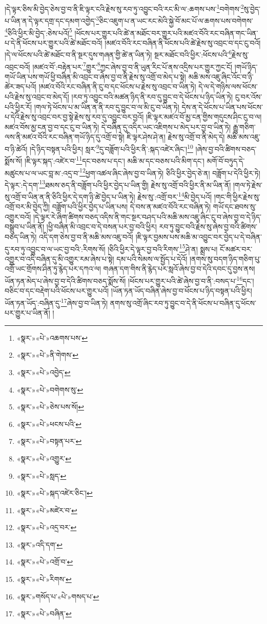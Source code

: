 །དེ་ལྟར་ཅིས་མི་བྱེད་ཅེས་བྱ་བ་ནི་ཇི་ལྟར་ངའི་རྗེས་སུ་རབ་ཏུ་འབྱུང་བའི་རང་མི་ལ་:ཆགས་པས་\footnote{«སྣར་»«པེ་»འཆགས་པས་}བགེགས་\footnote{«སྣར་»«པེ་»ནི་གེགས་}སུ་བྱེད་པ་ཡིན་ན་དེ་ལྟར་དགྲ་དང་དམག་འགྱེད་\footnote{«སྣར་»«པེ་»འབྱེད་}ཅིང་འཇུག་པ་ན་ཡང་རང་མེའི་སྐྱེ་བོ་མང་པོ་ལ་ཆགས་པས་བགེགས་\footnote{«སྣར་»«པེ་»བགེགས་སུ་}ཅིའི་ཕྱིར་མི་བྱེད་:ཅེས་པའོ།\footnote{«སྣར་»«པེ་»ཅེས་པས་སོ།} །ཕོངས་པར་གྱུར་པའི་ཚེ་ན་མཐོང་བར་གྱུར་པའི་མཛའ་བོའི་རང་བཞིན་གང་ཡིན་པ་དེ་ནི་ཕོངས་པར་གྱུར་པའི་ཚེ་མཐོང་བའོ། །མཛའ་བོའི་རང་བཞིན་ནི་ཕོངས་པའི་ཚེ་རྗེས་སུ་འབྲང་བ་དང་ངུ་བའོ། །དེ་ལ་ཕོངས་པའི་ཚེ་མཐོང་བ་ནི་སྔར་དུས་གཞན་གྱི་ཚེ་ན་ཡིན་ཏེ། སྔར་མཐོང་བའི་ཕྱིར་:ཕོངས་པའི་\footnote{«སྣར་»«པེ་»ཕངས་པའི་}རྗེས་སུ་འབྲང་བའོ། །མཛའ་བོ་:བརྟེན་པར་\footnote{«སྣར་»«པེ་»བསྟན་པར་}གྱུར་\footnote{«སྣར་»«པེ་»འགྱུར་}ཀྱང་ཞེས་བྱ་བ་ནི་ཡུན་རིང་པོ་ནས་འདྲིས་པར་གྱུར་ཀྱང་ངོ། །གཡོ་ཉིད་གཡོ་ཡིན་པས་གཡོ་ཕྱི་བཞིན་མི་འབྲང་བ་ཞེས་བྱ་བ་ནི་རྗེས་སུ་འགྲོ་བ་མེད་པ་སྟེ། མཆི་མས་འཇུ་ཞིང་འོང་བ་ཉི་ཚེར་ཟད་པའོ། །མཛའ་བོའི་རང་བཞིན་ནི་ངུ་བ་དང་ཕོངས་པ་རྗེས་སུ་འབྲང་བ་ཡིན་ཏེ། དེ་ལ་དེ་གཉིས་ལས་ཕོངས་པའི་རྗེས་སུ་འབྲང་བ་མེད་དོ། །རབ་ཏུ་འབྱུང་བའི་མཚན་ཉིད་ནི་རབ་དུ་བྱུང་བ་དེ་ཕོངས་པ་ཉིད་ཡིན་ཏེ། ངུ་བར་འོས་པའི་ཕྱིར་རོ། །གལ་ཏེ་ཕོངས་པ་མ་ཡིན་ན་ནི་རབ་དུ་བྱུང་བ་ལ་མི་ངུ་བ་ཡིན་ཏེ། དེས་ན་དེ་ཕོངས་པ་ཡིན་པས་ཕོངས་པ་དེའི་རྗེས་སུ་འབྲང་བར་བྱ་སྟེ་རྗེས་སུ་རབ་དུ་འབྱུང་བར་བྱའོ། །ཇི་ལྟར་མཛའ་བོ་མྱ་ངན་གྱིས་གདུངས་ཤིང་ངུ་བ་ལ། མཛའ་བོས་མྱ་ངན་བྱ་བ་དང་ངུ་བ་ཡིན་ཏེ། དེ་བཞིན་དུ་འདིར་ཡང་འཇིགས་པ་མེད་པར་བྱ་བ་ཡིན་ཏེ། རྒྱུ་གཅིག་ལས་ནི་མཛའ་བོའི་རང་བཞིན་གཡོ་ཉིད་དུ་འགྲོ་བ་སྟེ། ཇི་ལྟར་ཤེས་ཤེ་ན། རྗེས་སུ་འགྲོ་བ་ནི་མེད་དེ། མཆི་མས་འཇུ་བ་ཉི་ཚེའོ། །དེ་ཉིད་བསྟན་པའི་ཕྱིར། སླར་\footnote{«སྣར་»«པེ་»སླད་}དུ་བཟློག་པའི་ཕྱིར་ནི་:སྐད་འཛེར་ཞིང་།\footnote{«སྣར་»«པེ་»སྐད་འཛེར་ཅིང་།} །ཞེས་བྱ་བའི་ཚིགས་བཅད་སྨོས་སོ། །ཇི་ལྟར་སྐད་:འཛེར་བ་\footnote{«སྣར་»«པེ་»མཛེར་བ་}དང་བཅས་པ་དང་། མཆི་མ་དང་བཅས་པའི་མིག་དང་། མགོ་བོ་བཏུད་དེ་མཚུངས་པ་ལ་ཡང་བླ་མ་:འདྲ་བ་\footnote{«སྣར་»«པེ་»འདྲ་བར་}ཕྱག་འཚལ་ཞིང་ཞེས་བྱ་བ་ཡིན་ཏེ། ཅིའི་ཕྱིར་བྱེད་ཅེ་ན། བཟློག་པ་དེའི་ཕྱིར་ཏེ། དེ་ལྟར་:དེ་དག་\footnote{«སྣར་»འདི་དག་}ཐམས་ཅད་ནི་བཟློག་པའི་ཕྱིར་བྱེད་པ་ཡིན་གྱི། རྗེས་སུ་འགྲོ་བའི་ཕྱིར་ནི་མ་ཡིན་ནོ། །གལ་ཏེ་རྗེས་སུ་འགྲོ་བ་ཡིན་ན་ནི་ཅིའི་ཕྱིར་དེ་དག་ཉི་ཚེ་བྱེད་པ་ཡིན་ཏེ། རྗེས་སུ་:འགྲོ་བར་\footnote{«སྣར་»«པེ་»འགྲོ་བ་}མི་བྱེད་པའོ། །གང་གི་ཕྱིར་རྗེས་སུ་འགྲོ་བར་མི་བྱེད་ཀྱི། བཟློག་པའི་ཕྱིར་བྱེད་པ་ཡིན་པས། དེ་བས་ན་མཛའ་བོའི་རང་བཞིན་ཏེ། གཡོ་དང་ཐབས་སུ་འགྱུར་བའོ། །དེ་ལྟར་རེ་ཞིག་ཚིགས་བཅད་འདིས་ནི་གང་སྔར་བཤད་པའི་མཆི་མས་འཇུ་ཞིང་ངུ་བ་ཞེས་བྱ་བ་དེ་ཉིད་བསྒྲུབ་པ་ཡིན་ནོ། །ཕྱི་བཞིན་མི་འབྲང་བ་དེ་བསན་པར་བྱ་བའི་ཕྱིར། རབ་ཏུ་བྱུང་བའི་རྗེས་སུ་ཞེས་བྱ་བའི་ཚིགས་བཅད་ཡིན་ཏེ། འདི་དག་ཅེས་བྱ་བ་ནི་མཆི་མས་འཇུ་བའོ། །ཇི་ལྟར་བྱམས་པས་མཆི་མ་འབྱུང་བར་བྱེད་པ་དེ་བཞིན་དུ་རབ་ཏུ་འབྱུང་བ་ལ་ཡང་བྱ་བའི་:རིགས་སོ། །ཅིའི་ཕྱིར་དེ་ལྟར་བྱ་བའི་རིགས་\footnote{«སྣར་»«པེ་»རིགས་}ཤེ་ན། སྨྲས་པ། ངོ་མཚར་བར་འགྱུར་བ་འདི་བཞིན་དུ་མི་འགྱུར་རམ་ཞེས་པ་སྟེ། དམ་པའི་སེམས་ལ་སྤྱོད་པ་དེའོ། །ནགས་སུ་བདག་ཉིད་གཅིག་པུ་འགྲོ་ཡང་གྲོགས་ཤིན་ཏུ་རྙེད་པར་དཀའ་ལ། གཞན་དག་གིས་ནི་རྙེད་པར་སླའོ་ཞེས་བྱ་བ་དེའི་དབང་དུ་བྱས་ནས། ཡོན་ཏན་མེད་པ་ཞེས་བྱ་བ་དེའི་ཚིགས་བཅད་སྨོས་སོ། །ཕོངས་པར་གྱུར་པའི་ཚེ་ཞེས་བྱ་བ་ནི་:བསད་པ་\footnote{«སྣར་»གསོད་པ་«པེ་»གསད་པ་}དང་། བཅིང་བ་དང་བརྡེག་པའི་ཕོངས་པར་གྱུར་པའོ། །ཡོན་ཏན་ཡོད་བཞིན་ཞེས་བྱ་བ་ཕོངས་པ་ཉིད་བསྟན་པའི་ཕྱིར། ཡོན་ཏན་ཡོད་:བཞིན་དུ་\footnote{«སྣར་»«པེ་»བཞིན་}ཞེས་བྱ་བ་ཡིན་ཏེ། ནགས་སུ་འགྲོ་ཞིང་རབ་ཏུ་བྱུང་བ་དེ་ནི་ཕོངས་པ་བཞིན་དུ་ཕོངས་པར་གྱུར་པ་ཡིན་ནོ། །
